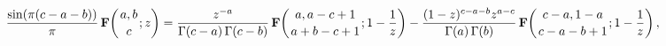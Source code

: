 \[\frac{\mathop{\sin\/}\nolimits\!\left(\pi(c-a-b)\right)}{\pi}\mathop{\mathbf{F%
}\/}\nolimits\!\left({a,b\atop c};z\right)=\frac{z^{-a}}{\mathop{\Gamma\/}%
\nolimits\!\left(c-a\right)\mathop{\Gamma\/}\nolimits\!\left(c-b\right)}%
\mathop{\mathbf{F}\/}\nolimits\!\left({a,a-c+1\atop a+b-c+1};1-\frac{1}{z}%
\right)-\frac{(1-z)^{c-a-b}z^{a-c}}{\mathop{\Gamma\/}\nolimits\!\left(a\right)%
\mathop{\Gamma\/}\nolimits\!\left(b\right)}\mathop{\mathbf{F}\/}\nolimits\!%
\left({c-a,1-a\atop c-a-b+1};1-\frac{1}{z}\right),\]